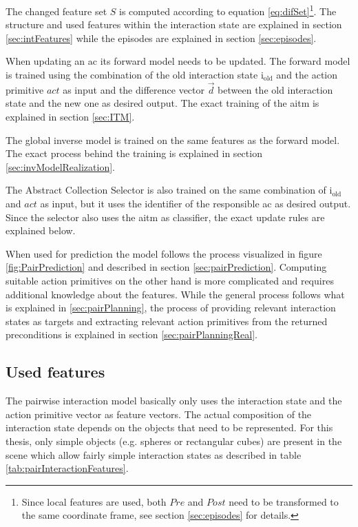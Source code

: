 The changed feature set $S$ is computed according to equation \ref{eq:difSet}\footnote{Since local features are used, both $Pre$ and $Post$ need to be transformed to the same coordinate frame, see section \ref{sec:episodes} for details.}. The structure and used features within the interaction state are explained in section \ref{sec:intFeatures} while the episodes are explained in section \ref{sec:episodes}.

When updating an \gls{ac} its forward model needs to be updated. The forward model is trained using the combination of the old interaction state  i$_\text{old}$ and the action primitive $act$ as input and the difference vector $\vec{d}$ between the old interaction state and the new one as desired output. The exact training of the \gls{aitm} is explained in section \ref{sec:ITM}. 

The global inverse model is trained on the same features as the forward model. The exact process behind the training is explained in section \ref{sec:invModelRealization}.

The Abstract Collection Selector is also trained on the same combination of i$_\text{old}$ and $act$ as input, but it uses the identifier of the responsible \gls{ac} as desired output.
Since the selector also uses the \gls{aitm} as classifier, the exact update rules are explained below.

When used for prediction the model follows the process visualized in figure \ref{fig:PairPrediction} and described in section \ref{sec:pairPrediction}.
Computing suitable action primitives on the other hand is more complicated and requires additional knowledge about the features. While the general process follows what is explained in \ref{sec:pairPlanning}, the process of providing relevant interaction states as targets and extracting relevant action primitives from the returned preconditions is explained in section \ref{sec:pairPlanningReal}.



\subsection{Used features \label{sec:intFeatures}}

The pairwise interaction model basically only uses the interaction state and the action primitive vector as feature vectors. The actual composition of the interaction state depends on the objects that need to be represented. For this thesis, only simple objects (e.g. spheres or rectangular cubes) are present in the scene which allow fairly simple interaction states as described in table \ref{tab:pairInteractionFeatures}.

